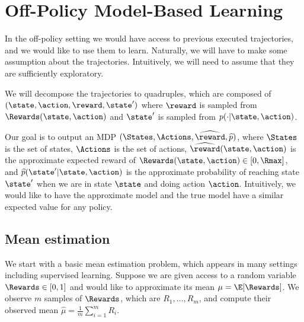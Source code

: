 \section{Off-Policy Model-Based Learning}

In the off-policy setting we would have access to previous executed
trajectories, and we would like to use them to learn. Naturally, we
will have to make some assumption about the trajectories.
Intuitively, we will need to assume that they are sufficiently
exploratory.

We will decompose the trajectories to quadruples, which are composed
of
$
(\state,\action,\reward,\state')
$
where $\reward$ is sampled from $\Rewards(\state,\action)$ and
$\state'$ is sampled from $p(\cdot|\state,\action)$.

Our goal is to output an MDP
$(\States,\Actions,\widehat{\reward},\widehat{p})$, where $\States$
is the set of states, $\Actions$ is the set of actions,
$\widehat{\reward}(\state,\action)$ is the approximate expected
reward of $\Rewards(\state,\action)\in[0,\Rmax]$, and
$\widehat{p}(\state'|\state,\action)$ is the approximate probability
of reaching state $\state'$ when we are in state $\state$ and doing
action $\action$. Intuitively, we would like to have the approximate
model and the true model have a similar expected value for any policy.

\subsection{Mean estimation}

We start with a basic mean estimation problem, which appears in many
settings including supervised learning.
Suppose we are given access to a random variable $\Rewards\in[0,1]$
and would like to approximate its mean $\mu=\E[\Rewards]$. We
observe $m$ samples of $\Rewards$, which are $R_1, \ldots, R_m$, and
compute their observed mean $\widehat{\mu}=\frac{1}{m}\sum_{i=1}^m
R_i$.

